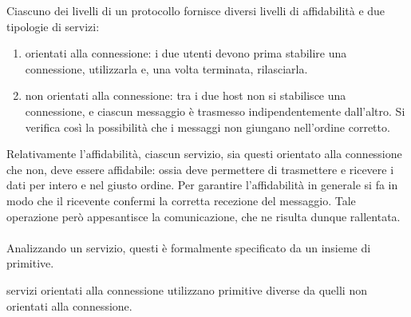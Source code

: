 \documentclass{subfiles}
\begin{document}
Ciascuno dei livelli di un protocollo fornisce diversi livelli di affidabilità e due tipologie di servizi:
\begin{enumerate}
    \item orientati alla connessione: i due utenti devono prima stabilire una connessione, utilizzarla e, una volta terminata, rilasciarla.

    \item non orientati alla connessione: tra i due host non si stabilisce una connessione, e ciascun messaggio è trasmesso indipendentemente dall'altro.
          Si verifica così la possibilità che i messaggi non giungano nell'ordine corretto.
\end{enumerate}

Relativamente l'affidabilità, ciascun servizio, sia questi orientato alla connessione che non, deve essere affidabile:
ossia deve permettere di trasmettere e ricevere i dati per intero e nel giusto ordine.
Per garantire l'affidabilità in generale si fa in modo che il ricevente confermi la corretta recezione del messaggio.
Tale operazione però appesantisce la comunicazione, che ne risulta dunque rallentata.
\\ \\
Analizzando un servizio, questi è formalmente specificato da un insieme di primitive.
\begin{MarginNote}
    servizi orientati alla connessione utilizzano primitive diverse da quelli non orientati alla connessione.
\end{MarginNote}
\end{document}
